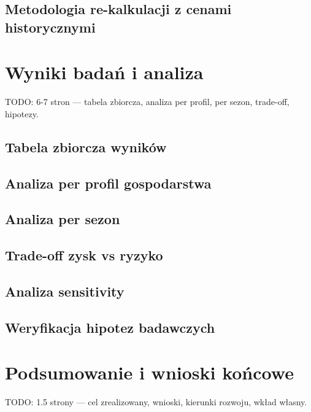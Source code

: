 \documentclass[12pt,twoside]{article}
\begin{document}
\subsection{Metodologia re-kalkulacji z cenami historycznymi}


\section{Wyniki badań i analiza}
\label{sec:wyniki}

TODO: 6-7 stron — tabela zbiorcza, analiza per profil, per sezon, trade-off, hipotezy.

\subsection{Tabela zbiorcza wyników}
\subsection{Analiza per profil gospodarstwa}
\subsection{Analiza per sezon}
\subsection{Trade-off zysk vs ryzyko}
\subsection{Analiza sensitivity}
\subsection{Weryfikacja hipotez badawczych}


\section{Podsumowanie i wnioski końcowe}

TODO: 1.5 strony — cel zrealizowany, wnioski, kierunki rozwoju, wkład własny.


\end{document}
